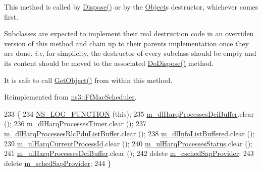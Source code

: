 This method is called by \hyperlink{classns3_1_1Object_aa90ae598863f6c251cdab3c3722afdaf}{Dispose()} or by the \hyperlink{classns3_1_1Object}{Object}\textquotesingle{}s destructor, whichever comes first.

Subclasses are expected to implement their real destruction code in an overriden version of this method and chain up to their parent\textquotesingle{}s implementation once they are done. {\itshape i.\+e}, for simplicity, the destructor of every subclass should be empty and its content should be moved to the associated \hyperlink{classns3_1_1TtaFfMacScheduler_ad3d4985db1ebff0babefc8a6a5a2f132}{Do\+Dispose()} method.

It is safe to call \hyperlink{classns3_1_1Object_a13e18c00017096c8381eb651d5bd0783}{Get\+Object()} from within this method. 

Reimplemented from \hyperlink{classns3_1_1FfMacScheduler_a771411e455992b81d8399681779debd9}{ns3\+::\+Ff\+Mac\+Scheduler}.


\begin{DoxyCode}
233 \{
234   \hyperlink{log-macros-disabled_8h_a90b90d5bad1f39cb1b64923ea94c0761}{NS\_LOG\_FUNCTION} (\textcolor{keyword}{this});
235   \hyperlink{classns3_1_1TtaFfMacScheduler_aef07d22e5c2e6acf1f711736bce49fc8}{m\_dlHarqProcessesDciBuffer}.clear ();
236   \hyperlink{classns3_1_1TtaFfMacScheduler_ac17ab46a13a0d51459cc7b1d7e5ebc06}{m\_dlHarqProcessesTimer}.clear ();
237   \hyperlink{classns3_1_1TtaFfMacScheduler_a04e2e36b8114bfe977b8a3443822d7f1}{m\_dlHarqProcessesRlcPduListBuffer}.clear ();
238   \hyperlink{classns3_1_1TtaFfMacScheduler_af7afa3d5a610456175b21bad17cc04ae}{m\_dlInfoListBuffered}.clear ();
239   \hyperlink{classns3_1_1TtaFfMacScheduler_af8bd1675d63b73c0374a39180e1cbf54}{m\_ulHarqCurrentProcessId}.clear ();
240   \hyperlink{classns3_1_1TtaFfMacScheduler_a2c0bc82abe6c71b7e4d85b4caca2aaa6}{m\_ulHarqProcessesStatus}.clear ();
241   \hyperlink{classns3_1_1TtaFfMacScheduler_a9ead4d91174d42d6995978358c08689e}{m\_ulHarqProcessesDciBuffer}.clear ();
242   \textcolor{keyword}{delete} \hyperlink{classns3_1_1TtaFfMacScheduler_ac83b9f23cb828f8b40e9e4a9b6d60204}{m\_cschedSapProvider};
243   \textcolor{keyword}{delete} \hyperlink{classns3_1_1TtaFfMacScheduler_a9b40317b5fb7668b316e0e4a4f3a6d09}{m\_schedSapProvider};
244 \}
\end{DoxyCode}
